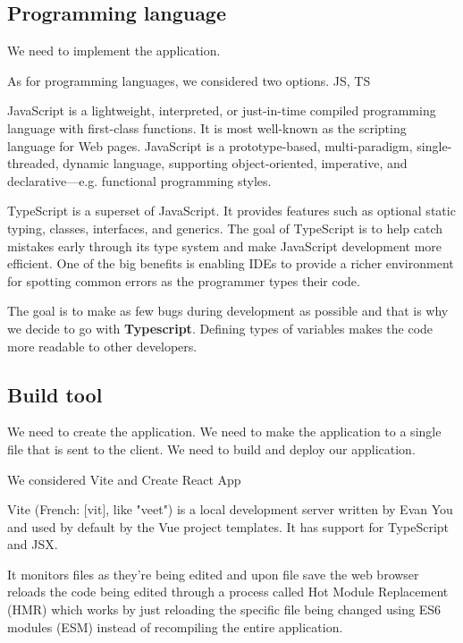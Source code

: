 \subsection*{Programming language}
  We need to implement the application.

  As for programming languages, we considered two options. 
  JS, TS

  JavaScript is a lightweight, interpreted, or just-in-time compiled programming language with first-class functions. 
  It is most well-known as the scripting language for Web pages. 
  JavaScript is a prototype-based, multi-paradigm, single-threaded, dynamic language, supporting object-oriented, imperative, and declarative---e.g. functional programming styles.

  TypeScript is a superset of JavaScript. 
  It provides features such as optional static typing, classes, interfaces, and generics. 
  The goal of TypeScript is to help catch mistakes early through its type system and make JavaScript development more efficient. 
  One of the big benefits is enabling IDEs to provide a richer environment for spotting common errors as the programmer types their code.

  The goal is to make as few bugs during development as possible and that is why we decide to go with \textbf{Typescript}.
  Defining types of variables makes the code more readable to other developers.

\subsection*{Build tool}
  We need to create the application.
  We need to make the application to a single file that is sent to the client.
  We need to build and deploy our application.

  We considered Vite and Create React App

  Vite (French: [vit], like "veet") is a local development server written by Evan You and used by default by the Vue project templates. It has support for TypeScript and JSX.

  It monitors files as they're being edited and upon file save the web browser reloads the code being edited through a process called Hot Module Replacement (HMR) which works by just reloading the specific file being changed using ES6 modules (ESM) instead of recompiling the entire application.

